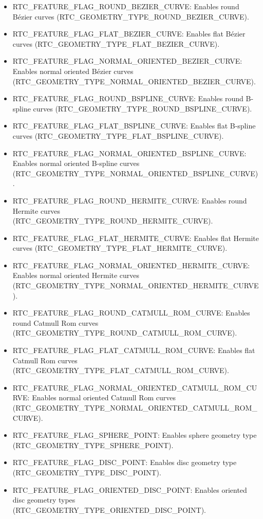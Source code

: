 \begin{itemize}
\item
  RTC\_FEATURE\_FLAG\_ROUND\_BEZIER\_CURVE: Enables round Bézier curves
  (RTC\_GEOMETRY\_TYPE\_ROUND\_BEZIER\_CURVE).
\item
  RTC\_FEATURE\_FLAG\_FLAT\_BEZIER\_CURVE: Enables flat Bézier curves
  (RTC\_GEOMETRY\_TYPE\_FLAT\_BEZIER\_CURVE).
\item
  RTC\_FEATURE\_FLAG\_NORMAL\_ORIENTED\_BEZIER\_CURVE: Enables normal
  oriented Bézier curves
  (RTC\_GEOMETRY\_TYPE\_NORMAL\_ORIENTED\_BEZIER\_CURVE).
\item
  RTC\_FEATURE\_FLAG\_ROUND\_BSPLINE\_CURVE: Enables round B-spline
  curves (RTC\_GEOMETRY\_TYPE\_ROUND\_BSPLINE\_CURVE).
\item
  RTC\_FEATURE\_FLAG\_FLAT\_BSPLINE\_CURVE: Enables flat B-spline curves
  (RTC\_GEOMETRY\_TYPE\_FLAT\_BSPLINE\_CURVE).
\item
  RTC\_FEATURE\_FLAG\_NORMAL\_ORIENTED\_BSPLINE\_CURVE: Enables normal
  oriented B-spline curves
  (RTC\_GEOMETRY\_TYPE\_NORMAL\_ORIENTED\_BSPLINE\_CURVE).
\item
  RTC\_FEATURE\_FLAG\_ROUND\_HERMITE\_CURVE: Enables round Hermite
  curves (RTC\_GEOMETRY\_TYPE\_ROUND\_HERMITE\_CURVE).
\item
  RTC\_FEATURE\_FLAG\_FLAT\_HERMITE\_CURVE: Enables flat Hermite curves
  (RTC\_GEOMETRY\_TYPE\_FLAT\_HERMITE\_CURVE).
\item
  RTC\_FEATURE\_FLAG\_NORMAL\_ORIENTED\_HERMITE\_CURVE: Enables normal
  oriented Hermite curves
  (RTC\_GEOMETRY\_TYPE\_NORMAL\_ORIENTED\_HERMITE\_CURVE).
\item
  RTC\_FEATURE\_FLAG\_ROUND\_CATMULL\_ROM\_CURVE: Enables round Catmull
  Rom curves (RTC\_GEOMETRY\_TYPE\_ROUND\_CATMULL\_ROM\_CURVE).
\item
  RTC\_FEATURE\_FLAG\_FLAT\_CATMULL\_ROM\_CURVE: Enables flat Catmull
  Rom curves (RTC\_GEOMETRY\_TYPE\_FLAT\_CATMULL\_ROM\_CURVE).
\item
  RTC\_FEATURE\_FLAG\_NORMAL\_ORIENTED\_CATMULL\_ROM\_CURVE: Enables
  normal oriented Catmull Rom curves
  (RTC\_GEOMETRY\_TYPE\_NORMAL\_ORIENTED\_CATMULL\_ROM\_CURVE).
\item
  RTC\_FEATURE\_FLAG\_SPHERE\_POINT: Enables sphere geometry type
  (RTC\_GEOMETRY\_TYPE\_SPHERE\_POINT).
\item
  RTC\_FEATURE\_FLAG\_DISC\_POINT: Enables disc geometry type
  (RTC\_GEOMETRY\_TYPE\_DISC\_POINT).
\item
  RTC\_FEATURE\_FLAG\_ORIENTED\_DISC\_POINT: Enables oriented disc
  geometry types (RTC\_GEOMETRY\_TYPE\_ORIENTED\_DISC\_POINT).

\end{itemize}
